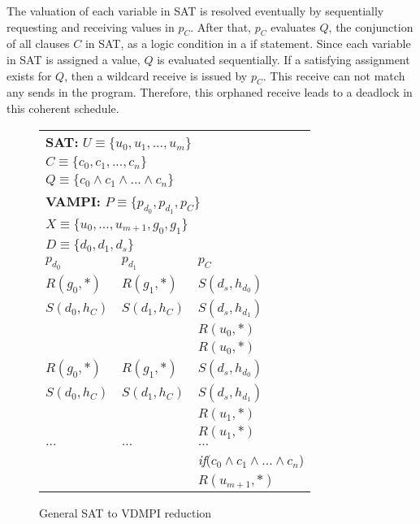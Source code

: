 The valuation of each variable in SAT is resolved eventually by sequentially requesting and receiving values in $\mathit{p_C}$. After that, $\mathit{p_C}$ evaluates $Q$, the conjunction of all clauses $C$ in SAT, as a logic condition in a if statement. Since each variable in SAT is assigned a value, $Q$ is evaluated sequentially. If a satisfying assignment exists for $Q$, then a wildcard receive is issued by $\mathit{p_C}$. This receive can not match any sends in the program. Therefore, this orphaned receive leads to a deadlock in this coherent schedule. 
 
\begin{figure}
\begin{center}
\setlength{\tabcolsep}{2pt}
\begin{tabular}[t]{|l|l|l|}
\hline
\multicolumn{3}{|l|}{\textbf{SAT:} $\mathit{U\equiv\{u_0,u_1,...,u_m\}}$}\\
              \multicolumn{3}{|l|}{$\mathit{C\equiv\{c_0,c_1,...,c_n\}}$}\\
              \multicolumn{3}{|l|}{$\mathit{Q\equiv\{c_0\wedge c_1\wedge ...\wedge c_n\}}$}\\
\hline
\multicolumn{3}{|l|}{\textbf{VAMPI:} $\mathit{P\equiv\{p_{d_0},p_{d_1},p_{C}\}}$}\\
                \multicolumn{3}{|l|}{$\mathit{X\equiv\{u_0,...,u_{m+1},g_0,g_1\}}$}\\
                \multicolumn{3}{|l|}{$\mathit{D\equiv\{d_0,d_1,d_s\}}$}\\
\hline
$p_{d_0}$ & $p_{d_1}$ & $p_C$ \\
\hline
$R(g_{0},*)$   & $R(g_{1},*)$   & $S(d_s,h_{d_0})$ \\
$S(d_{0},h_C)$ & $S(d_{1},h_C)$ & $S(d_s,h_{d_1})$ \\
              &                & $R(u_0,*)$        \\
              &                & $R(u_0,*)$        \\
\hline
$R(g_{0},*)$  &  $R(g_{1},*)$   & $S(d_s,h_{d_0})$ \\
$S(d_{0},h_C)$&  $S(d_{1},h_C)$ & $S(d_s,h_{d_1})$ \\
              &                & $R(u_1,*)$       \\
              &                & $R(u_1,*)$       \\
\hline
$\ldots$      &  $\ldots$      & $\ldots$                \\
\hline
              &                & \textit{if}($c_0\wedge c_1\wedge ...\wedge c_n$) \\
              &                & $R(u_{m+1},*)$ \\
\hline
\end{tabular}
\end{center}
\caption{General SAT to VDMPI reduction}
\label{fig:vdmpi}
\end{figure}

